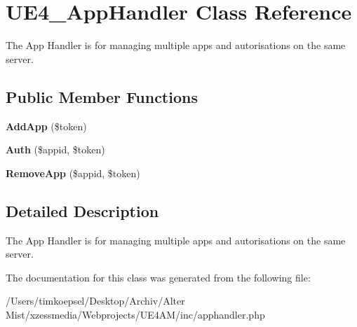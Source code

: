 \hypertarget{class_u_e4___app_handler}{\section{U\-E4\-\_\-\-App\-Handler Class Reference}
\label{class_u_e4___app_handler}
}


The App Handler is for managing multiple apps and autorisations on the same server.  


\subsection*{Public Member Functions}
\begin{DoxyCompactItemize}
\item 
\hypertarget{class_u_e4___app_handler_a919f9fd314bea09db6a45a5f2bf4b28f}{{\bfseries Add\-App} (\$token)}\label{class_u_e4___app_handler_a919f9fd314bea09db6a45a5f2bf4b28f}

\item 
\hypertarget{class_u_e4___app_handler_a2de878e2040a5f01b8537a159cde6b91}{{\bfseries Auth} (\$appid, \$token)}\label{class_u_e4___app_handler_a2de878e2040a5f01b8537a159cde6b91}

\item 
\hypertarget{class_u_e4___app_handler_a94694c6eb18f42b9ae57fb363541c3f4}{{\bfseries Remove\-App} (\$appid, \$token)}\label{class_u_e4___app_handler_a94694c6eb18f42b9ae57fb363541c3f4}

\end{DoxyCompactItemize}


\subsection{Detailed Description}
The App Handler is for managing multiple apps and autorisations on the same server. 

The documentation for this class was generated from the following file\-:\begin{DoxyCompactItemize}
\item 
/\-Users/timkoepsel/\-Desktop/\-Archiv/\-Alter Mist/xzessmedia/\-Webprojects/\-U\-E4\-A\-M/inc/apphandler.\-php\end{DoxyCompactItemize}
